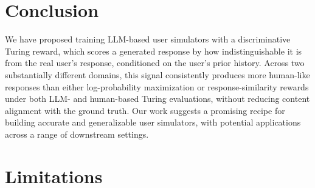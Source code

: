 \documentclass{article} %
\begin{document}
\section{Conclusion}

We have proposed training LLM-based user simulators with a discriminative Turing reward, which scores a generated response by how indistinguishable it is from the real user's response, conditioned on the user's prior history. Across two substantially different domains, this signal consistently produces more human-like responses than either log-probability maximization or response-similarity rewards under both LLM- and human-based Turing evaluations, without reducing content alignment with the ground truth. 
Our work suggests a promising recipe for building accurate and generalizable user simulators, with potential applications across a range of downstream settings. 





\section*{Limitations}
\end{document}
